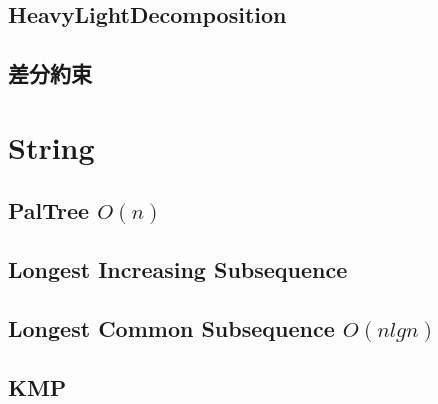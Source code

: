 \documentclass[a4paper,10pt,twocolumn,oneside]{article}
\begin{document}
\subsection{HeavyLightDecomposition}


\subsection{差分約束}


%

% 

\section{String}

\subsection{PalTree $O(n)$}


%

\subsection{Longest Increasing Subsequence}


\newpage
\subsection{Longest Common Subsequence $O(nlgn)$}


\subsection{KMP}

\end{document}
